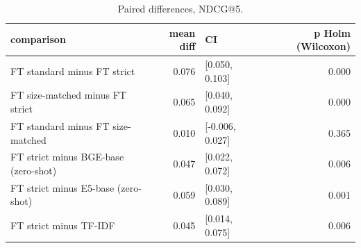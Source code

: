 \begin{table}
\caption{Paired differences, NDCG@5.}
\label{tab:t4c_ndcg5_tests}
\begin{tabular}{lrlr}
\toprule
comparison & mean diff & CI & p Holm (Wilcoxon) \\
\midrule
FT standard  minus  FT strict & 0.076 & [0.050, 0.103] & 0.000 \\
FT size-matched  minus  FT strict & 0.065 & [0.040, 0.092] & 0.000 \\
FT standard  minus  FT size-matched & 0.010 & [-0.006, 0.027] & 0.365 \\
FT strict  minus  BGE-base (zero-shot) & 0.047 & [0.022, 0.072] & 0.006 \\
FT strict  minus  E5-base (zero-shot) & 0.059 & [0.030, 0.089] & 0.001 \\
FT strict  minus  TF-IDF & 0.045 & [0.014, 0.075] & 0.006 \\
\bottomrule
\end{tabular}
\end{table}
